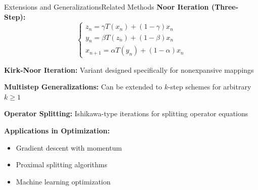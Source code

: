 \documentclass[aspectratio=169,10pt]{beamer}
\begin{document}
\begin{frame}{Extensions and Generalizations}{Related Methods}
\textbf{Noor Iteration (Three-Step):}
\[
\begin{cases}
z_n = \gamma T(x_n) + (1-\gamma) x_n \\
y_n = \beta T(z_n) + (1-\beta) x_n \\
x_{n+1} = \alpha T(y_n) + (1-\alpha) x_n
\end{cases}
\]

\vspace{0.3cm}

\textbf{Kirk-Noor Iteration:} Variant designed specifically for nonexpansive mappings

\vspace{0.3cm}

\textbf{Multistep Generalizations:} Can be extended to $k$-step schemes for arbitrary $k \geq 1$

\vspace{0.3cm}

\textbf{Operator Splitting:} Ishikawa-type iterations for splitting operator equations

\vspace{0.3cm}

\textbf{Applications in Optimization:}
\begin{itemize}
    \item Gradient descent with momentum
    \item Proximal splitting algorithms
    \item Machine learning optimization
\end{itemize}
\end{frame}
\end{document}
